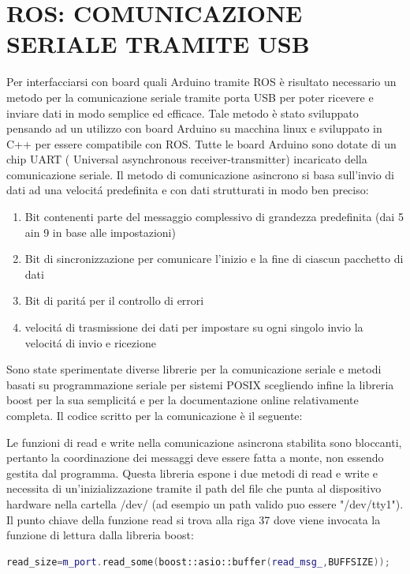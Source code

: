 \documentclass[a4paper]{article}
\begin{document}
\section{ROS: COMUNICAZIONE SERIALE TRAMITE USB}
Per interfacciarsi con board quali Arduino tramite ROS è risultato necessario un metodo per la comunicazione seriale tramite porta USB per poter ricevere e inviare dati in modo semplice ed efficace.
Tale metodo è stato sviluppato pensando ad un utilizzo con board Arduino su macchina linux e sviluppato in C++ per essere compatibile con ROS.
Tutte le board Arduino sono dotate di un chip UART ( Universal asynchronous receiver-transmitter) incaricato della comunicazione seriale.
Il metodo di comunicazione asincrono si basa sull'invio di dati ad una velocitá predefinita e con dati strutturati in modo ben preciso:
\begin{enumerate} 
    \item Bit contenenti parte del messaggio complessivo di grandezza predefinita (dai 5 ain 9 in base alle impostazioni)
    \item Bit di sincronizzazione per comunicare l'inizio e la fine di ciascun pacchetto di dati
    \item Bit di paritá per il controllo di errori
    \item velocitá di trasmissione dei dati per impostare su ogni singolo invio la velocitá di invio e ricezione
\end{enumerate}
Sono state sperimentate diverse librerie per la comunicazione seriale e metodi basati su programmazione seriale per sistemi POSIX scegliendo infine la libreria boost per la sua semplicitá e per la documentazione online relativamente completa.
Il codice scritto per la comunicazione è il seguente:


Le funzioni di read e write nella comunicazione asincrona stabilita sono bloccanti, pertanto la coordinazione dei messaggi deve essere fatta a monte, non essendo gestita dal programma.
Questa libreria espone i due metodi di read e write e necessita di un'inizializzazione tramite il path del file che punta al dispositivo hardware nella cartella /dev/ (ad esempio un path valido puo essere "/dev/tty1").
Il punto chiave della funzione read si trova alla riga 37 dove viene invocata la funzione di lettura dalla libreria boost:

\begin{lstlisting}[language=C++,firstnumber=37]
read_size=m_port.read_some(boost::asio::buffer(read_msg_,BUFFSIZE));
\end{lstlisting}
\end{document}
